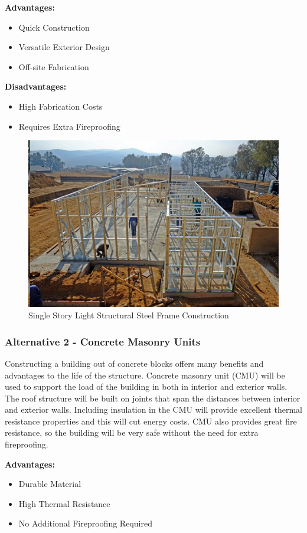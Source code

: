 \documentclass{ceri}
\begin{document}
	\textbf{Advantages:}
\begin{itemize}
\item  Quick Construction
\item Versatile Exterior Design
\item Off-site Fabrication
\end{itemize}

	\textbf{Disadvantages:}
\begin{itemize}
\item High Fabrication Costs
\item Requires Extra Fireproofing
\end{itemize}

\begin{figure}[H]
    \centering
    \includegraphics[width=.5\textwidth]{images/Structural1.png}
    \caption{Single Story Light Structural Steel Frame Construction}
    \label{fig:S_SSLSS}
\end{figure}

\subsubsection{Alternative 2 - Concrete Masonry Units}
Constructing a building out of concrete blocks offers many benefits and advantages to the life of the structure. Concrete masonry unit (CMU) will be used to support the load of the building in both in interior and exterior walls. The roof structure will be built on joints that span the distances between interior and exterior walls. Including insulation in the CMU will provide excellent thermal resistance properties and this will cut energy costs. CMU also provides great fire resistance, so the building will be very safe without the need for extra fireproofing.

\textbf{Advantages:}
\begin{itemize}
\item  Durable Material
\item High Thermal Resistance
\item No Additional Fireproofing Required
\end{itemize}
\end{document}
